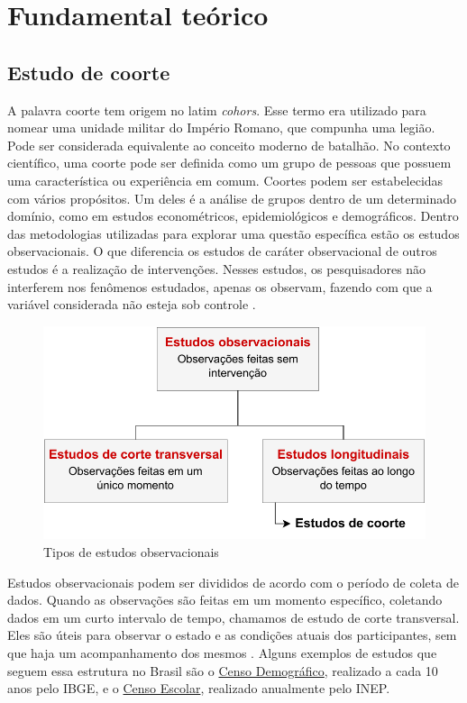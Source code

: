 \chapter{Fundamental teórico}
\section{Estudo de coorte}
A palavra coorte tem origem no latim \textit{cohors}. Esse termo era utilizado para nomear uma unidade militar do Império Romano, que compunha uma legião. Pode ser considerada equivalente ao conceito moderno de batalhão. No contexto científico, uma coorte pode ser definida como um grupo de pessoas que possuem uma característica ou experiência em comum. Coortes podem ser estabelecidas com vários propósitos. Um deles é a análise de grupos dentro de um determinado domínio, como em estudos econométricos, epidemiológicos e demográficos. Dentro das metodologias utilizadas para explorar uma questão específica estão os estudos observacionais. O que diferencia os estudos de caráter observacional de outros estudos é a realização de intervenções. Nesses estudos, os pesquisadores não interferem nos fenômenos estudados, apenas os observam, fazendo com que a variável considerada não esteja sob controle \autocite{Song2010}.

\begin{figure}[h]
\caption{Tipos de estudos observacionais}
\centering
\includegraphics{figuras/diagrama-estudos-observacionais.pdf}
\end{figure}


Estudos observacionais podem ser divididos de acordo com o período de coleta de dados. Quando as observações são feitas em um momento específico, coletando dados em um curto intervalo de tempo, chamamos de estudo de corte transversal. Eles são úteis para observar o estado e as condições atuais dos participantes, sem que haja um acompanhamento dos mesmos \autocite{Zangirolami-Raimundo2018}. Alguns exemplos de estudos que seguem essa estrutura no Brasil são o \href{https://www.ibge.gov.br/estatisticas/sociais/trabalho/22827-censo-demografico-2022.html?=&t=o-que-e}{Censo Demográfico}, realizado a cada 10 anos pelo IBGE, e o \href{https://www.gov.br/inep/pt-br/areas-de-atuacao/pesquisas-estatisticas-e-indicadores/censo-escolar}{Censo Escolar}, realizado anualmente pelo INEP. 

